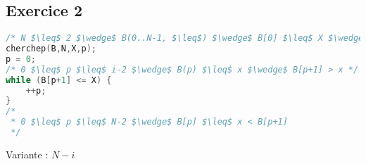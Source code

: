 \subsection{Exercice 2}

\begin{lstlisting}[language=C]
/* N $\leq$ 2 $\wedge$ B(0..N-1, $\leq$) $\wedge$ B[0] $\leq$ X $\wedge$ B[N-1] > X */
cherchep(B,N,X,p);
p = 0; 
/* 0 $\leq$ p $\leq$ i-2 $\wedge$ B(p) $\leq$ x $\wedge$ B[p+1] > x */ 
while (B[p+1] <= X) {
	++p;
}
/* 
 * 0 $\leq$ p $\leq$ N-2 $\wedge$ B[p] $\leq$ x < B[p+1] 
 */
\end{lstlisting}
Variante : $N - i$

